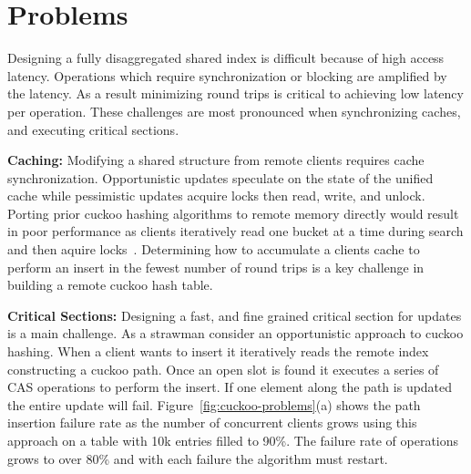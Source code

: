 \section{Problems}
\label{sec:problems}


Designing a fully disaggregated shared index is difficult
because of high access latency. Operations which require
synchronization or blocking are amplified by the latency. As
a result minimizing round trips is critical to achieving low
latency per operation. These challenges are most pronounced
when synchronizing caches, and executing critical sections.


\textbf{Caching:} Modifying a shared structure from remote
clients requires cache synchronization. Opportunistic
updates speculate on the state of the unified cache while
pessimistic updates acquire locks then read, write, and
unlock. Porting prior cuckoo hashing algorithms to remote
memory directly would result in poor performance as clients
iteratively read one bucket at a time during search and then
aquire locks~\cite{cuckoo-improvements, memc3, pilaf}.
Determining how to accumulate a clients cache to perform an
insert in the fewest number of round trips is a key
challenge in building a remote cuckoo hash table.



\textbf{Critical Sections:} Designing a fast, and fine
grained critical section for updates is a main challenge. As
a strawman consider an opportunistic approach to cuckoo
hashing. When a client wants to insert it iteratively reads
the remote index constructing a cuckoo path. Once an open
slot is found it executes a series of CAS operations to
perform the insert. If one element along the path is updated
the entire update will fail.
Figure~\ref{fig:cuckoo-problems}(a) shows the path insertion
failure rate as the number of concurrent clients grows using
this approach on a table with 10k entries filled to 90\%.
The failure rate of operations grows to over 80\% and with each
failure the algorithm must restart.

